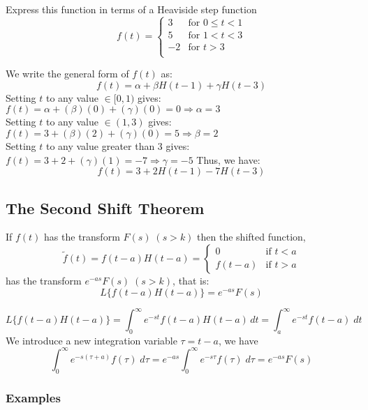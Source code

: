 \documentclass[a4paper, 10pt]{article}
\begin{document}
\begin{examplebox}{Express this function in terms of a Heaviside step function}{}
  $$f(t) = \begin{cases}
      3  & \text{for } 0 \leq t < 1 \\
      5  & \text{for } 1 < t < 3    \\
      -2 & \text{for } t > 3        \\
    \end{cases}$$

  We write the general form of $f(t)$ as:
  $$f(t) = \alpha + \beta H(t-1) + \gamma H(t-3)$$
  Setting $t$ to any value $\in [0,1)$ gives: $f(t) = \alpha + (\beta)(0) + (\gamma)(0) = 0 \Rightarrow \alpha = 3$ \\
  Setting $t$ to any value $\in (1,3)$ gives: $f(t) = 3 + (\beta)(2) + (\gamma)(0) = 5 \Rightarrow \beta = 2$ \\
  Setting $t$ to any value greater than 3 gives: $f(t) = 3 + 2 + (\gamma)(1) = -7 \Rightarrow \gamma = -5$
  Thus, we have:
  $$f(t) = 3 + 2H(t-1) - 7H(t-3)$$
\end{examplebox}

\pagebreak

\subsection{The Second Shift Theorem}
\begin{theorembox}
  If $f(t)$ has the transform $F(s) \; (s > k)$ then the shifted function,
  $$
    \tilde{f}(t) = f(t-a)H(t-a) = \begin{cases}
      0      & \text{if } t < a \\
      f(t-a) & \text{if } t > a
    \end{cases}
  $$
  has the transform $e^{-as}F(s)\; (s > k)$, that is:
  $$L\{f(t-a)H(t-a)\} = e^{-as}F(s)$$
\end{theorembox}

\begin{proofbox}
  $$L\{f(t-a)H(t-a)\} = \int_0^\infty e^{-st}f(t-a)H(t-a)\, dt = \int_a^\infty e^{-st}f(t-a)\;dt$$
  We introduce a new integration variable $\tau = t-a$, we have
  $$\int_0^\infty e^{-s(\tau + a)}f(\tau)\;d\tau = e^{-as}\int_0^\infty e^{-s\tau}f(\tau)\;d\tau = e^{-as}F(s)$$
\end{proofbox}

\subsubsection{Examples}
\end{document}

